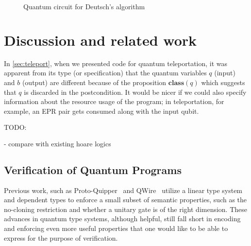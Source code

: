 \documentclass[adraft,creativecommons]{eptcs}
\theoremstyle{definition}
\theoremstyle{remark}
\begin{document}
\begin{figure}
    \centering
    \caption{Quantum circuit for Deutsch's algorithm}
    \label{fig:deutsch}
\end{figure}



\section{Discussion and related work}

In \cref{sec:teleport}, when we presented code for quantum teleportation, it was apparent from its type (or specification) that the quantum variables $q$ (input) and $b$ (output) are different because of the proposition $\mathbf{class}(q)$ which suggests that $q$ is discarded in the postcondition. It would be nicer if we could also specify information about the resource usage of the program; in teleportation, for example, an EPR pair gets consumed along with the input qubit.

TODO:

- compare with existing hoare logics

\subsection{Verification of Quantum Programs}
Previous work, such as Proto-Quipper~\cite{rios2017,rios2017} and QWire~\cite{qwire2017,qwirepractice2017,rand2018} utilize a linear type system and dependent types to enforce a small subset of semantic properties, such as the no-cloning restriction and whether a unitary gate is of the right dimension. These advances in quantum type systems, although helpful, still fall short in encoding and enforcing even more useful properties that one would like to be able to express for the purpose of verification.
\end{document}
